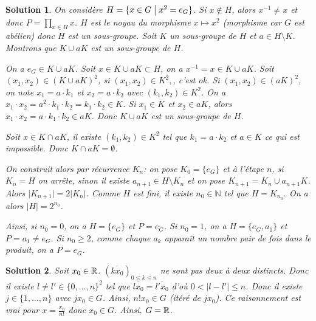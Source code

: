 \documentclass[12pt]{article}
\newtheorem{solution}{Solution}[section]
\theoremstyle{remark}
\newcommand{\N}{\mathbb{N}} \newcommand{\Z}{\mathbb{Z}}
\numberwithin{equation}{section}
\begin{document}
\begin{solution}
	On considère $H=\{x\in G\bigm| x^{2}=e_{G}\}$. Si $x\notin H$, alors $x^{-1}\neq x$ et donc $P=\prod_{x\in H}x$. $H$ est le noyau du morphisme $x\mapsto x^{2}$ (morphisme car $G$ est abélien) donc $H$ est un sous-groupe. Soit $K$ un sous-groupe de $H$ et $a\in H\setminus K$. Montrons que $K\cup aK$ est un sous-groupe de $H$.
	
	On a $e_{G}\in K\cup aK$. Soit $x\in K\cup aK\subset H$, on a $x^{-1}=x\in K\cup aK$. Soit $(x_{1},x_{2})\in (K\cup aK)^{2}$, si $(x_{1},x_{2})\in K^{2},$, c'est ok. Si $(x_{1},x_{2})\in (aK)^{2}$, on note $x_{1}=a\cdot k_{1}$ et $x_{2}=a\cdot k_{2}$ avec $(k_{1},k_{2})\in K^{2}$. On a $x_{1}\cdot x_{2}=a^{2}\cdot k_{1}\cdot k_{2}=k_{1}\cdot k_{2}\in K$. Si $x_{1}\in K$ et $x_{2}\in aK$, alors $x_{1}\cdot x_{2}=a\cdot k_{1}\cdot k_{2}\in aK$. Donc $K\cup aK$ est un sous-groupe de $H$.

	Soit $x\in K\cap aK$, il existe $(k_{1},k_{2})\in K^{2}$ tel que $k_{1}=a\cdot k_{2}$ et $a\in K$ ce qui est impossible. Donc $K\cap aK=\emptyset$.

	On construit alors par récurrence $K_{n}$: on pose $K_{0}=\{e_{G}\}$ et à l'étape $n$, si $K_{n}=H$ on arrête, sinon il existe $a_{n+1}\in H\setminus K_{n}$ et on pose $K_{n+1}=K_{n}\cup a_{n+1}K$. Alors $\vert K_{n+1}\vert=2\vert K_{n}\vert$. Comme $H$ est fini, il existe $n_{0}\in\N$ tel que $H=K_{n_{0}}$. On a alors $\vert H\vert=2^{n_{0}}$.

	Ainsi, si $n_{0}=0$, on a $H=\{e_{G}\}$ et $P=e_{G}$. Si $n_{0}=1$, on a $H=\{e_{G},a_{1}\}$ et $P=a_{1}\neq e_{G}$. Si $n_{0}\geqslant 2$, comme chaque $a_{k}$ apparaît un nombre pair de fois dans le produit, on a $P=e_{G}$.
\end{solution}

\begin{solution}
	Soit $x_{0}\in\mathbb{R}$. $(\overline{kx_{0}})_{0\leqslant k\leqslant n}$ ne sont pas deux à deux distincts. Donc il existe $l\neq l'\in\{0,\dots,n\}^{2}$ tel que $\overline{lx_{0}}=\overline{l'x_{0}}$ d'où $0<\vert l-l'\vert\leqslant n$. Donc il existe $j\in\{1,\dots, n\}$ avec $jx_{0}\in G$. Ainsi, $n!x_{0}\in G$ (itéré de $jx_{0}$). Ce raisonnement est vrai pour $x=\frac{x_{0}}{n!}$ donc $x_{0}\in G$. Ainsi, $G=\mathbb{R}$.
\end{solution}
\end{document}
